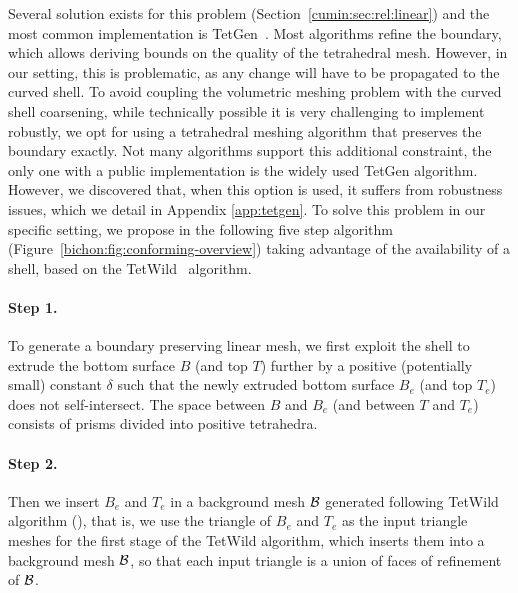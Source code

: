 Several solution exists for this problem (Section~\ref{cumin:sec:rel:linear}) and the most common implementation is TetGen~\cite{si2015tetgen}. Most algorithms refine the boundary, which allows {deriving} bounds on the quality of the tetrahedral mesh. However, in our setting, this is problematic, as any change will have to be propagated to the curved shell. To avoid coupling the volumetric meshing problem with the curved shell coarsening, while technically possible it is very challenging to implement robustly, we opt for using a tetrahedral meshing algorithm that preserves the boundary exactly. Not many algorithms support this additional constraint, the only one with a public implementation is the widely used TetGen algorithm. However, we discovered that, when this option is used, it suffers from robustness issues, which we detail in Appendix \ref{app:tetgen}.
%
To solve this problem in our specific setting, we propose in the following five step algorithm (Figure~\ref{bichon:fig:conforming-overview}) taking advantage of the availability of a shell, based on the  TetWild~\cite{hu2018tetrahedral} algorithm. %

\paragraph{Step 1.}
To generate a boundary preserving linear mesh, we first exploit the shell to extrude the bottom surface $B$ (and top $T$) {further} by a positive (potentially small) constant $\delta$ such that the newly extruded bottom surface $B_e$ (and top $T_e$) does not self-intersect. The space between $B$ and $B_e$ (and between $T$ and $T_e$) consists of prisms {divided} into positive tetrahedra. 

\paragraph{Step 2.}
Then we insert $B_e$ and $T_e$ in a background mesh $\mathcal{B}$ generated following TetWild algorithm (\cite[Section 3.1]{hu2018tetrahedral}), that is, we use the triangle of $B_e$ and $T_e$ as the input triangle meshes for the first stage of the TetWild algorithm, which inserts them into a background mesh $\mathcal{B}$, so that
each input triangle is a union of faces of refinement of $\mathcal{B}$.


